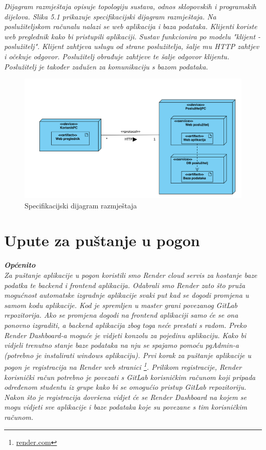 			\textit{Dijagram razmještaja opisuje topologiju sustava, odnos sklopovskih i programskih dijelova. Slika 5.1 prikazuje specifikacijski dijagram razmještaja. Na poslužiteljskom računalu nalazi se web aplikacija i baza podataka. Klijenti koriste web preglednik kako bi pristupili aplikaciji. Sustav funkcionira po modelu "klijent - poslužitelj". Klijent zahtjeva uslugu od strane poslužitelja, šalje mu HTTP zahtjev i očekuje odgovor. Poslužitelj obrađuje zahtjeve te šalje odgovor klijentu. Poslužitelj je također zadužen za komunikaciju s bazom podataka. }

			\bigskip
			\bigskip
			
			\begin{figure}[H]
				\centering
				\includegraphics[width=\textwidth]{slike/dijagram_razmjestaja.png}
				\caption{Specifikacijski dijagram razmještaja}
				\label{fig:my_label}
			\end{figure}
		
		
		\newpage
		
		
		\section{Upute za puštanje u pogon}
		
		\textbf{\textit{Općenito}}\\
			\textit{Za puštanje aplikacije u pogon koristili smo Render cloud servis za hostanje baze podatka te backend i frontend aplikacija. Odabrali smo Render zato što pruža mogućnost automatske izgradnje aplikacije svaki put kad se dogodi promjena u samom kodu aplikacije. Kod je spremljen u master grani povezanog GitLab repozitorija. Ako se promjena dogodi na frontend aplikaciji samo će se ona ponovno izgraditi, a backend aplikacija zbog toga neće prestati s radom. Preko Render Dashboard-a moguće je vidjeti konzolu za pojedinu aplikaciju. Kako bi vidjeli trenutno stanje baze podataka na nju se spajamo pomoću pgAdmin-a (potrebno je instalirati windows aplikaciju).
			Prvi korak za puštanje aplikacije u pogon je registracija na Render web stranici \footnote{\url{render.com}}. Prilikom registracije, Render korisnički račun potrebno je povezati s GitLab korisničkim računom koji pripada određenom studentu iz grupe kako bi se omogućio pristup GitLab repozitoriju. Nakon što je registracija dovršena vidjet će se Render Dashboard na kojem se mogu vidjeti sve aplikacije i baze podataka koje su povezane s tim korisničkim računom.}
		\bigskip
	
